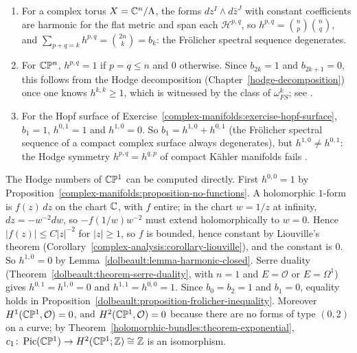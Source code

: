 \begin{example}\label{dolbeault:example-hodge-numbers}
\begin{enumerate}
\item For a complex torus $X = \mathbb{C}^n/\Lambda$, the forms $dz^I \wedge d\bar z^J$ with constant coefficients are harmonic for the flat metric and span each $\mathcal{H}^{p,q}$, so
$h^{p,q} = \binom{n}{p}\binom{n}{q}$, and $\sum_{p+q=k}h^{p,q} = \binom{2n}{k} = b_k$: the Fr\"olicher spectral sequence degenerates.
\item For $\mathbb{C}\mathbb{P}^n$, $h^{p,q} = 1$ if $p = q \leq n$ and $0$ otherwise. Since $b_{2k} = 1$ and $b_{2k+1} = 0$, this follows from the Hodge decomposition (Chapter~\ref{hodge-decomposition}) once one knows
$h^{k,k} \geq 1$, which is witnessed by the class of $\omega_{FS}^k$; see \cite[Chapter 0, Section 7]{griffiths-harris}.
\item For the Hopf surface of Exercise~\ref{complex-manifolds:exercise-hopf-surface}, $b_1 = 1$, $h^{0,1} = 1$ and $h^{1,0} = 0$. So $b_1 = h^{1,0} + h^{0,1}$ (the Fr\"olicher spectral sequence of a compact
complex surface always degenerates), but $h^{1,0} \neq h^{0,1}$: the Hodge symmetry $h^{p,q} = h^{q,p}$ of compact K\"ahler manifolds fails \cite[Chapter IV]{bhpv}.
\end{enumerate}
\end{example}

\begin{example}\label{dolbeault:example-riemann-sphere}
The Hodge numbers of $\mathbb{C}\mathbb{P}^1$ can be computed directly. First $h^{0,0} = 1$ by Proposition~\ref{complex-manifolds:proposition-no-functions}. A holomorphic $1$-form is $f(z)\,dz$ on the chart $\mathbb{C}$, with $f$
entire; in the chart $w = 1/z$ at infinity, $dz = -w^{-2}dw$, so $-f(1/w)w^{-2}$ must extend holomorphically to $w = 0$. Hence $|f(z)| \leq C|z|^{-2}$ for $|z| \geq 1$, so $f$ is bounded, hence constant by
Liouville's theorem (Corollary~\ref{complex-analysis:corollary-liouville}), and the constant is $0$. So $h^{1,0} = 0$ by Lemma~\ref{dolbeault:lemma-harmonic-closed}. Serre duality
(Theorem~\ref{dolbeault:theorem-serre-duality}, with $n = 1$ and $E = \mathcal{O}$ or $E = \Omega^1$) gives $h^{0,1} = h^{1,0} = 0$ and $h^{1,1} = h^{0,0} = 1$. Since $b_0 = b_2 = 1$ and $b_1 = 0$, equality
holds in Proposition~\ref{dolbeault:proposition-frolicher-inequality}. Moreover $H^1(\mathbb{C}\mathbb{P}^1, \mathcal{O}) = 0$, and $H^2(\mathbb{C}\mathbb{P}^1, \mathcal{O}) = 0$ because there are no forms of type $(0,2)$ on a curve; by
Theorem~\ref{holomorphic-bundles:theorem-exponential}, $c_1 \colon \operatorname{Pic}(\mathbb{C}\mathbb{P}^1) \to H^2(\mathbb{C}\mathbb{P}^1; \mathbb{Z}) \cong \mathbb{Z}$ is an isomorphism.
\end{example}

